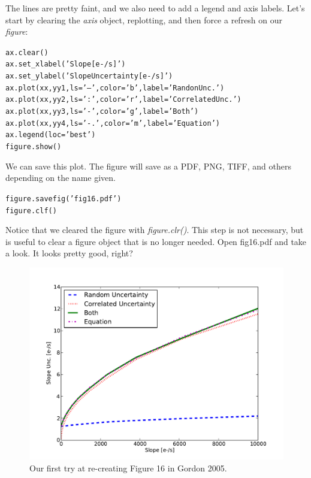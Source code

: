 The lines are pretty faint, and we also need to add a legend and axis
labels. Let's start by clearing the \textit{axis} object, replotting, and then 
force a refresh on our \textit{figure}:

\begin{alltt}
\pytab ax.clear()
\pytab ax.set_xlabel('Slope [e-/s]')
\pytab ax.set_ylabel('Slope Uncertainty [e-/s]')
\pytab ax.plot(xx, yy1, ls='--', color='b', label='Randon Unc.')
\pytab ax.plot(xx, yy2, ls=':', color='r', label='Correlated Unc.')
\pytab ax.plot(xx, yy3, ls='-', color='g', label='Both')
\pytab ax.plot(xx, yy4, ls='-.', color='m', label='Equation')
\pytab ax.legend(loc='best')
\pytab figure.show()
\end{alltt}

We can save this plot.  The figure will save as a PDF, PNG, TIFF, and
others depending on the name given.

\begin{alltt}
\pytab figure.savefig('fig16.pdf')
\pytab figure.clf()
\end{alltt}

Notice that we cleared the figure with \textit{figure.clr()}. This step is not 
necessary, but is useful to clear a figure object that is no longer needed. 
Open fig16.pdf and take a look.  It looks pretty good, right?

\begin{figure}[tbp]
  \centering
    \includegraphics[scale=0.55]{splot.pdf}
    \caption{Our first try at re-creating Figure 16 in Gordon 2005.}
  \label{fig:splot}
\end{figure}

